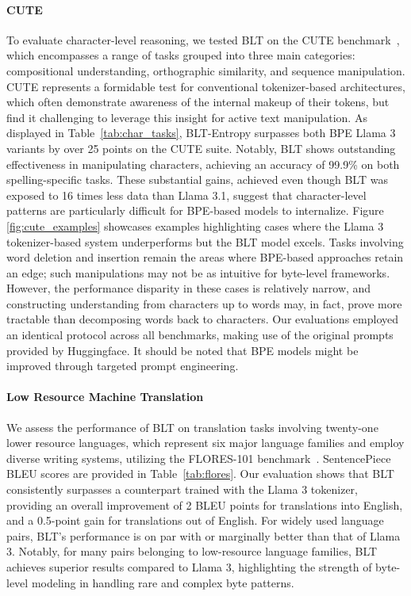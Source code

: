 \paragraph{CUTE}
To evaluate character-level reasoning, we tested {\textsc BLT} on the CUTE benchmark~\citep{edman2024cute}, which encompasses a range of tasks grouped into three main categories: compositional understanding, orthographic similarity, and sequence manipulation. CUTE represents a formidable test for conventional tokenizer-based architectures, which often demonstrate awareness of the internal makeup of their tokens, but find it challenging to leverage this insight for active text manipulation. As displayed in Table~\ref{tab:char_tasks}, {\textsc BLT}-Entropy surpasses both BPE Llama 3 variants by over 25 points on the CUTE suite. Notably, {\textsc BLT} shows outstanding effectiveness in manipulating characters, achieving an accuracy of 99.9\% on both spelling-specific tasks. These substantial gains, achieved even though {\textsc BLT} was exposed to 16 times less data than Llama 3.1, suggest that character-level patterns are particularly difficult for BPE-based models to internalize. Figure \ref{fig:cute_examples} showcases examples highlighting cases where the Llama 3 tokenizer-based system underperforms but the {\textsc BLT} model excels. Tasks involving word deletion and insertion remain the areas where BPE-based approaches retain an edge; such manipulations may not be as intuitive for byte-level frameworks. However, the performance disparity in these cases is relatively narrow, and constructing understanding from characters up to words may, in fact, prove more tractable than decomposing words back to characters. Our evaluations employed an identical protocol across all benchmarks, making use of the original prompts provided by Huggingface. It should be noted that BPE models might be improved through targeted prompt engineering.

\paragraph{Low Resource Machine Translation} We assess the performance of {\textsc BLT} on translation tasks involving twenty-one lower resource languages, which represent six major language families and employ diverse writing systems, utilizing the FLORES-101 benchmark~\citep{goyal2022flores}. SentencePiece BLEU scores are provided in Table~\ref{tab:flores}. Our evaluation shows that {\textsc BLT} consistently surpasses a counterpart trained with the Llama 3 tokenizer, providing an overall improvement of 2 BLEU points for translations into English, and a 0.5-point gain for translations out of English. For widely used language pairs, {\textsc BLT}'s performance is on par with or marginally better than that of Llama 3. Notably, for many pairs belonging to low-resource language families, {\textsc BLT} achieves superior results compared to Llama 3, highlighting the strength of byte-level modeling in handling rare and complex byte patterns.

